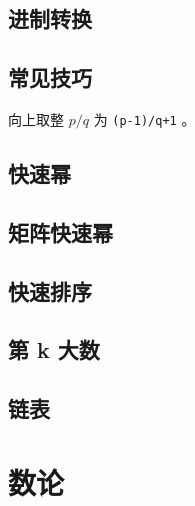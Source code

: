 \documentclass[cn,11pt,blue,normal,founder]{elegantbook}
\begin{document}
\section{进制转换}



\section{常见技巧}

向上取整 $p/q$ 为 \lstinline[style=cpp]{(p-1)/q+1} 。

%


%

\section{快速幂} %



\section{矩阵快速幂}



\section{快速排序}



\section{第 k 大数}



\section{链表}




\chapter{数论}
\end{document}

